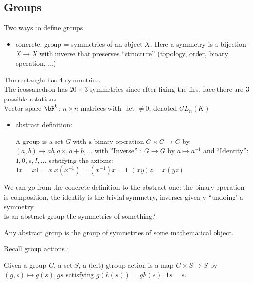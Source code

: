 
\subsection{Groups}

Two ways to define groups
\begin{itemize}
    \item concrete: group = symmetries of an object $X$. Here a symmetry is a bijection $X \to X$ with inverse that preserves ``structure'' (topology, order, binary operation, $\ldots$)
\end{itemize}

\begin{example}
    The rectangle has 4 symmetries. \\
    The icossahedron has $20 \times 3$ symmetries since after fixing the first face there are 3 possible rotations. \\
    Vector space $\bR^k$: $n \times n$ matrices with $\det \neq 0$, denoted $GL_n(K)$
\end{example}

\begin{itemize}
    \item abstract definition: \\
    \begin{definition}
        A group is a set $G$ with a binary operation $G \times G \to G$ by $(a,b) \mapsto ab, a \times , a + b, \ldots$ with ''Inverse'' : $G \to G$ by $a \mapsto a^{-1}$ and ``Identity'': $1, 0, e, I, \ldots$ satsifying the axioms: \\
        $1x = x1 = x$ \quad $x(x^{-1}) = (x^{-1})x = 1$ \quad $(xy)z = x(yz)$ 
    \end{definition}
\end{itemize}

\noindent
We can go from the concrete definition to the abstract one: the binary operation is composition, the identity is the trivial symmetry, inverses given y ``undoing' a symmetry. \\

\noindent
Is an abstract group the symmetries of something? 

\begin{theorem}
    Any abstract group is the group of symmetries of some mathematical object. 
\end{theorem}

\noindent
Recall group actions : 

\begin{definition}
    Given a group $G$, a set $S$, a (left) gtroup action is a map $G \times S \to S$ by $(g,s) \mapsto g(s), gs$ satisfying $g(h(s)) = gh(s)$, $1s=s$.
\end{definition}

